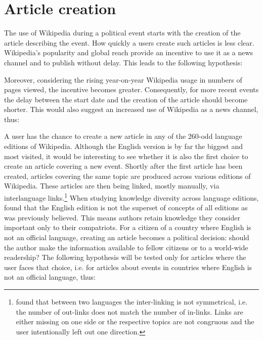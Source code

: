 \section{Article creation}\label{sec:articlecreation}

The use of Wikipedia during a political event starts with the creation of the article describing the event.
How quickly a users create such articles is less clear.
Wikipedia's popularity and global reach provide an incentive to use it as a news channel and to publish without delay.
This leads to the following hypothesis:


Moreover, considering the rising year-on-year Wikipedia usage in numbers of pages viewed\cite{wikipv}, the incentive becomes greater.
Consequently, for more recent events the delay between the start date and the creation of the article should become shorter.
This would also suggest an increased use of Wikipedia as a news channel, thus:


A user has the chance to create a new article in any of the 260-odd language editions of Wikipedia.
Although the English version is by far the biggest and most visited, it would be interesting to see whether it is also the first choice to create an article covering a new event.
Shortly after the first article has been created, articles covering the same topic are produced across various editions of Wikipedia.
These articles are then being linked, mostly manually, via interlanguage links.\footnote{\textcite{adar2009information} found that between two languages the inter-linking is not symmetrical, i.e. the number of out-links does not match the number of in-links. Links are either missing on one side or the respective topics are not congruous and the user intentionally left out one direction.}
When studying knowledge diversity across language editions, \textcite{hecht2010tower} found that the English edition is not the superset of concepts of all editions as was previously believed.
This means authors retain knowledge they consider important only to their compatriots.
For a citizen of a country where English is not an official language, creating an article becomes a political decision: should the author make the information available to fellow citizens or to a world-wide readership?
The following hypothesis will be tested only for articles where the user faces that choice, i.e. for articles about events in countries where English is not an official language, thus:

